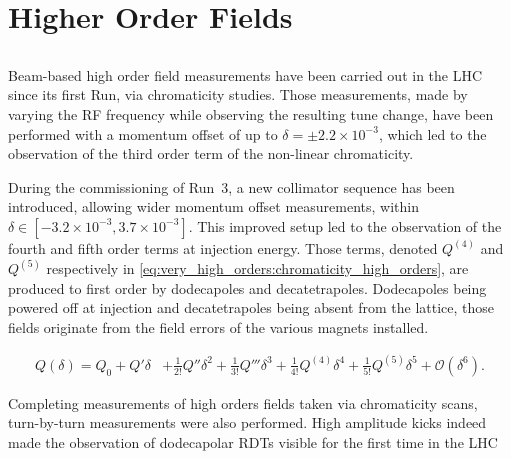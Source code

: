 \chapter{Higher Order Fields}
\thumbforchapter{}

\section{}

Beam-based high order field measurements have been carried out in the LHC since its first
Run, via chromaticity studies.
Those measurements, made by varying the RF frequency while observing the resulting tune change, have
been performed with a momentum offset of up to $\delta = \pm 2.2 \times 10^{-3}$, which led to the
observation of the third order term of the non-linear chromaticity.

During the commissioning of Run~3, a new collimator sequence has been introduced, allowing wider
momentum offset measurements, within $\delta \in [-3.2\times 10^{-3},3.7 \times 10^{-3}]$. This
improved setup led to the observation of the fourth and fifth order terms at injection energy.
Those terms, denoted $Q^{(4)}$ and $Q^{(5)}$ respectively in
\cref{eq:very_high_orders:chromaticity_high_orders}, are produced to first order by dodecapoles and
decatetrapoles. Dodecapoles being powered off at injection and decatetrapoles being absent from the
lattice, those fields originate from the field errors of the various magnets installed.

\begin{equation}
\begin{aligned}
Q(\delta) = Q_0 + Q'\delta &+ \frac{1}{2!}Q''\delta^2 + \frac{1}{3!}Q'''\delta^3
                            + \frac{1}{4!}Q^{(4)}\delta^4  + \frac{1}{5!}Q^{(5)}\delta^5
                            + \mathcal{O}(\delta^6).
\end{aligned}
    \label{eq:very_high_orders:chromaticity_high_orders}
\end{equation}

Completing measurements of high orders fields taken via chromaticity scans, turn-by-turn
measurements were also performed. High amplitude kicks indeed made the observation of dodecapolar
RDTs visible for the first time in the LHC




